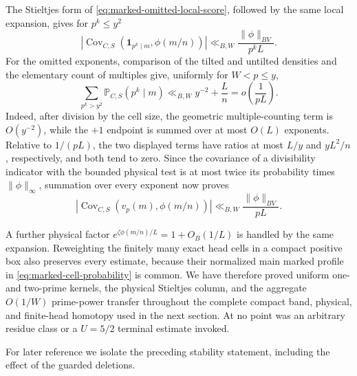 \documentclass[11pt]{article}
\numberwithin{equation}{section}
\theoremstyle{definition}
\theoremstyle{remark}
\newcommand{\1}{\mathbf 1}
\begin{document}
The Stieltjes form of \eqref{eq:marked-omitted-local-score}, followed by
the same local expansion, gives for \(p^k\le y^2\)
\[
 |\operatorname{Cov}_{C,S}(\1_{p^k\mid m},\phi(m/n))|
 \ll_{B,W}\frac{\|\phi\|_{BV}}{p^kL}.
\]
For the omitted exponents, comparison of the tilted and untilted
densities and the elementary count of multiples give, uniformly for
\(W<p\le y\),
\[
 \sum_{p^k>y^2}\mathbb P_{C,S}(p^k\mid m)
 \ll_{B,W}y^{-2}+\frac Ln
 =o\!\left(\frac1{pL}\right).
\]
Indeed, after division by the cell size, the geometric multiple-counting
term is \(O(y^{-2})\), while the \(+1\) endpoint is summed over at most
\(O(L)\) exponents.  Relative to \(1/(pL)\), the two displayed terms
have ratios at most \(L/y\) and \(yL^2/n\), respectively, and both tend
to zero.  Since the covariance of a divisibility indicator with the
bounded physical test is at most twice its probability times
\(\|\phi\|_\infty\), summation over every exponent now proves
\begin{equation}
 |\operatorname{Cov}_{C,S}(v_p(m),\phi(m/n))|
 \ll_{B,W}\frac{\|\phi\|_{BV}}{pL}.
 \label{eq:marked-tilted-physical-full}
\end{equation}

A further physical factor \(e^{\zeta\phi(m/n)/L}=1+O_{B}(1/L)\) is
handled by the same expansion.  Reweighting the finitely many exact head
cells in a compact positive box also preserves every estimate, because
their normalized main marked profile in
\eqref{eq:marked-cell-probability} is common.  We have therefore proved
uniform one- and two-prime kernels, the physical Stieltjes column, and the
aggregate \(O(1/W)\) prime-power transfer throughout the complete compact
band, physical, and finite-head homotopy used in the next section.  At no
point was an arbitrary residue class or a \(U=5/2\) terminal estimate
invoked.

For later reference we isolate the preceding stability statement,
including the effect of the guarded deletions.
\end{document}

